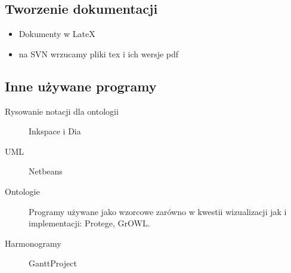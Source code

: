 \documentclass[a4paper,10pt]{article}
\begin{document}
\subsection{Tworzenie dokumentacji}
\begin{itemize}
 	\item Dokumenty w LateX
	\item na SVN wrzucamy pliki tex i ich wersje pdf
\end{itemize}


\subsection{Inne używane programy}

\begin{description}
 \item[Rysowanie notacji dla ontologii] Inkspace i Dia
 \item[UML] Netbeans
 \item[Ontologie] Programy używane jako wzorcowe zarówno w kwestii wizualizacji jak i implementacji: Protege, GrOWL.
 \item[Harmonogramy] GanttProject
\end{description}
\end{document}
